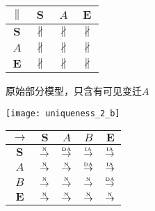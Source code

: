 \begin{figure}[htbp]
\begin{subfigure}{1\textwidth}
\begin{minipage}[b]{0.3\textwidth}
      \centering
      \begin{tabular}{|c|c|c|c|} \hline
        $\parallel$ & $\bm{S}$ & $A$ & $\bm{E}$\\ \hline
        $\bm{S}$ & $\nparallel$ & $\nparallel$ & $\nparallel$\\ \hline
        $A$ & $\nparallel$ & $\nparallel$ & $\nparallel$\\ \hline
        $\bm{E}$ & $\nparallel$ & $\nparallel$ & $\nparallel$\\ \hline
      \end{tabular}
    \end{minipage}
    \caption{原始部分模型，只含有可见变迁$A$}
    \label{fig:uniqueness_2_a}
  \end{subfigure}

  \begin{subfigure}{1\textwidth}
    \vspace{1em}
    \centering
    \begin{minipage}[b]{1\textwidth}
      \centering
      \texttt{[image: uniqueness\_2\_b]}
    \end{minipage}
    \begin{minipage}[b]{0.3\textwidth}
      \vspace{1em}
      \centering
      \begin{tabular}{|c|c|c|c|c|} \hline
        $\rightarrow$ & $\bm{S}$ & $A$ & $B$ & $\bm{E}$\\ \hline
        $\bm{S}$ & $\overset{\text{\tiny{N}}}{\rightarrow}$ & $\overset{\text{\tiny{DA}}}{\rightarrow}$ & $\overset{\text{\tiny{IA}}}{\rightarrow}$ & $\overset{\text{\tiny{IA}}}{\rightarrow}$\\ \hline
        $A$ & $\overset{\text{\tiny{N}}}{\rightarrow}$ & $\overset{\text{\tiny{N}}}{\rightarrow}$ & $\overset{\text{\tiny{DA}}}{\rightarrow}$ & $\overset{\text{\tiny{IA}}}{\rightarrow}$\\ \hline
        $B$ & $\overset{\text{\tiny{N}}}{\rightarrow}$ & $\overset{\text{\tiny{N}}}{\rightarrow}$ & $\overset{\text{\tiny{N}}}{\rightarrow}$ & $\overset{\text{\tiny{DA}}}{\rightarrow}$\\ \hline
        $\bm{E}$ & $\overset{\text{\tiny{N}}}{\rightarrow}$ & $\overset{\text{\tiny{N}}}{\rightarrow}$ & $\overset{\text{\tiny{N}}}{\rightarrow}$ & $\overset{\text{\tiny{N}}}{\rightarrow}$\\ \hline
      \end{tabular}
    \end{minipage}
    \begin{minipage}[b]{0.3\textwidth}

\end{minipage}
\end{subfigure}
\end{figure}

